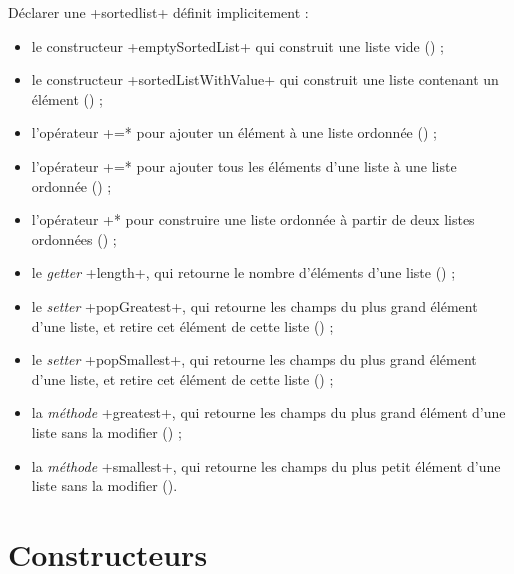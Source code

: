 Déclarer une \ggs+sortedlist+ définit implicitement :
\begin{itemize}
  \item le constructeur \ggs+emptySortedList+ qui construit une liste vide () ;
  \item le constructeur \ggs+sortedListWithValue+ qui construit une liste contenant un élément () ;
  \item l'opérateur \ggs*+=* pour ajouter un élément à une liste ordonnée () ;
  \item l'opérateur \ggs*+=* pour ajouter tous les éléments d'une liste à une liste ordonnée () ;
  \item l'opérateur \ggs*+* pour construire une liste ordonnée à partir de deux listes ordonnées () ;
  \item le \emph{getter} \ggs+length+, qui retourne le nombre d'éléments d'une liste () ;
  \item le \emph{setter} \ggs+popGreatest+, qui retourne les champs du plus grand élément d'une liste, et retire cet élément de cette liste () ;
  \item le \emph{setter} \ggs+popSmallest+, qui retourne les champs du plus grand élément d'une liste, et retire cet élément de cette liste () ;
  \item la \emph{méthode} \ggs+greatest+, qui retourne les champs du plus grand élément d'une liste sans la modifier () ;
  \item la \emph{méthode} \ggs+smallest+, qui retourne les champs du plus petit élément d'une liste sans la modifier ().
\end{itemize}








\section{Constructeurs}


